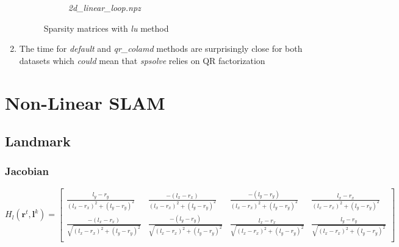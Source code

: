 \documentclass[12pt, a4paper]{article}
\begin{document}
\begin{enumerate}
\begin{figure}[H]
\begin{subfigure}[b]{0.45\textwidth}
      \caption{\textit{2d\_linear\_loop.npz}}
    \end{subfigure}
    \caption{Sparsity matrices with \textit{lu} method}
  \end{figure}
  
  \item The time for \textit{default} and \textit{qr\_colamd} methods are surprisingly close for both datasets which \textit{could} mean that \textit{spsolve} relies on QR factorization
\end{enumerate}
\section{Non-Linear SLAM}
\subsection{Landmark}
\subsubsection{Jacobian}
\[H_l(\mathbf{r}^t, \mathbf{l}^{k}) = \begin{bmatrix}
  \frac{l_y - r_y}{(l_x - r_x)^2 + (l_y - r_y)^2} & \frac{-(l_x - r_x)}{(l_x - r_x)^2 + (l_y - r_y)^2} & \frac{-(l_y - r_y)}{(l_x - r_x)^2 + (l_y - r_y)^2} & \frac{l_x - r_x}{(l_x - r_x)^2 + (l_y - r_y)^2}\\
  \frac{-(l_x - r_x)}{\sqrt{(l_x - r_x)^2 + (l_y - r_y)^2}} & \frac{-(l_y - r_y)}{\sqrt{(l_x - r_x)^2 + (l_y - r_y)^2}} & \frac{l_x - r_x}{\sqrt{(l_x - r_x)^2 + (l_y - r_y)^2}} & \frac{l_y - r_y}{\sqrt{(l_x - r_x)^2 + (l_y - r_y)^2}}\\
\end{bmatrix}\]
\end{document}
